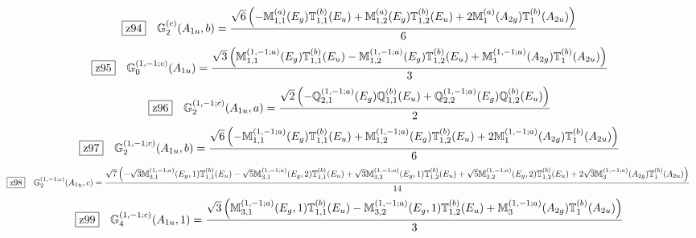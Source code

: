 \documentclass[fleqn,10pt,landscape]{jsarticle}
\begin{document}
\begin{dmath*}
\hspace*{3mm}\fbox{z94}\quad \mathbb{G}_{2}^{(c)}(A_{1u},b)=\frac{\sqrt{6} \left(- \mathbb{M}_{1,1}^{(a)}(E_{g}) \mathbb{T}_{1,1}^{(b)}(E_{u}) + \mathbb{M}_{1,2}^{(a)}(E_{g}) \mathbb{T}_{1,2}^{(b)}(E_{u}) + 2 \mathbb{M}_{1}^{(a)}(A_{2g}) \mathbb{T}_{1}^{(b)}(A_{2u})\right)}{6}
\end{dmath*}
\begin{dmath*}
\hspace*{3mm}\fbox{z95}\quad \mathbb{G}_{0}^{(1,-1;c)}(A_{1u})=\frac{\sqrt{3} \left(\mathbb{M}_{1,1}^{(1,-1;a)}(E_{g}) \mathbb{T}_{1,1}^{(b)}(E_{u}) - \mathbb{M}_{1,2}^{(1,-1;a)}(E_{g}) \mathbb{T}_{1,2}^{(b)}(E_{u}) + \mathbb{M}_{1}^{(1,-1;a)}(A_{2g}) \mathbb{T}_{1}^{(b)}(A_{2u})\right)}{3}
\end{dmath*}
\begin{dmath*}
\hspace*{3mm}\fbox{z96}\quad \mathbb{G}_{2}^{(1,-1;c)}(A_{1u},a)=\frac{\sqrt{2} \left(- \mathbb{Q}_{2,1}^{(1,-1;a)}(E_{g}) \mathbb{Q}_{1,1}^{(b)}(E_{u}) + \mathbb{Q}_{2,2}^{(1,-1;a)}(E_{g}) \mathbb{Q}_{1,2}^{(b)}(E_{u})\right)}{2}
\end{dmath*}
\begin{dmath*}
\hspace*{3mm}\fbox{z97}\quad \mathbb{G}_{2}^{(1,-1;c)}(A_{1u},b)=\frac{\sqrt{6} \left(- \mathbb{M}_{1,1}^{(1,-1;a)}(E_{g}) \mathbb{T}_{1,1}^{(b)}(E_{u}) + \mathbb{M}_{1,2}^{(1,-1;a)}(E_{g}) \mathbb{T}_{1,2}^{(b)}(E_{u}) + 2 \mathbb{M}_{1}^{(1,-1;a)}(A_{2g}) \mathbb{T}_{1}^{(b)}(A_{2u})\right)}{6}
\end{dmath*}
\begin{dmath*}
\hspace*{3mm}\fbox{z98}\quad \mathbb{G}_{2}^{(1,-1;c)}(A_{1u},c)=\frac{\sqrt{7} \left(- \sqrt{3} \mathbb{M}_{3,1}^{(1,-1;a)}(E_{g},1) \mathbb{T}_{1,1}^{(b)}(E_{u}) - \sqrt{5} \mathbb{M}_{3,1}^{(1,-1;a)}(E_{g},2) \mathbb{T}_{1,1}^{(b)}(E_{u}) + \sqrt{3} \mathbb{M}_{3,2}^{(1,-1;a)}(E_{g},1) \mathbb{T}_{1,2}^{(b)}(E_{u}) + \sqrt{5} \mathbb{M}_{3,2}^{(1,-1;a)}(E_{g},2) \mathbb{T}_{1,2}^{(b)}(E_{u}) + 2 \sqrt{3} \mathbb{M}_{3}^{(1,-1;a)}(A_{2g}) \mathbb{T}_{1}^{(b)}(A_{2u})\right)}{14}
\end{dmath*}
\begin{dmath*}
\hspace*{3mm}\fbox{z99}\quad \mathbb{G}_{4}^{(1,-1;c)}(A_{1u},1)=\frac{\sqrt{3} \left(\mathbb{M}_{3,1}^{(1,-1;a)}(E_{g},1) \mathbb{T}_{1,1}^{(b)}(E_{u}) - \mathbb{M}_{3,2}^{(1,-1;a)}(E_{g},1) \mathbb{T}_{1,2}^{(b)}(E_{u}) + \mathbb{M}_{3}^{(1,-1;a)}(A_{2g}) \mathbb{T}_{1}^{(b)}(A_{2u})\right)}{3}
\end{dmath*}
\end{document}
